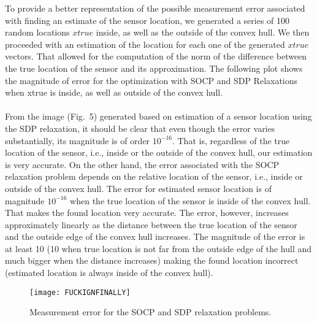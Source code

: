 \documentclass[12pt,letterpaper]{article}
\begin{document}
To provide a better representation of the possible measurement error associated with finding an estimate of the sensor location, we generated a series of 100 random locations $xtrue$ inside, as well as the outside of the convex hull. We then proceeded with an estimation of the location for each one of the generated $xtrue$ vectors. That allowed for the computation of the norm of the difference between the true location of the sensor and its approximation. The following plot shows the magnitude of error for the optimization with SOCP and SDP Relaxations when xtrue is inside, as well as outside of the convex hull. \\
\\
From the image (Fig.~5) generated based on estimation of a sensor location using the SDP relaxation, it should be clear that even though the error varies substantially, its magnitude is of order $10^{-16}$. That is, regardless of the true location of the sensor, i.e., inside or the outside of the convex hull, our estimation is  very accurate. On the other hand, the error associated with the SOCP relaxation problem depends on the relative location of the sensor, i.e., inside or outside of the convex hull. The error for estimated sensor location is of magnitude $10^{-16}$ when the true location of the sensor is inside of the convex hull. That makes the found location very accurate. The error, however, increases approximately linearly as the distance between the true location of the sensor and the outside edge of the convex hull increases. The magnitude of the error is at least 10 (10 when true location is not far from the outside edge of the hull and much bigger when the distance increases) making the found location incorrect (estimated location is always inside of the convex hull). 
\newpage
\begin{figure}[t]
\begin{center}
\texttt{[image: FUCKIGNFINALLY]}
\end{center}
\caption{Measurement error for the SOCP and SDP relaxation problems.}
\end{figure}
\end{document}
